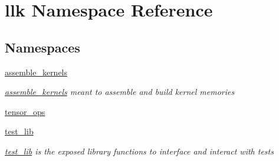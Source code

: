 \hypertarget{namespacellk}{}\section{llk Namespace Reference}
\label{namespacellk}
\subsection*{Namespaces}
\begin{DoxyCompactItemize}
\item 
 \hyperlink{namespacellk_1_1assemble__kernels}{assemble\+\_\+kernels}
\begin{DoxyCompactList}\small\item\em \hyperlink{namespacellk_1_1assemble__kernels}{assemble\+\_\+kernels} meant to assemble and build kernel memories \end{DoxyCompactList}\item 
 \hyperlink{namespacellk_1_1tensor__ops}{tensor\+\_\+ops}
\item 
 \hyperlink{namespacellk_1_1test__lib}{test\+\_\+lib}
\begin{DoxyCompactList}\small\item\em \hyperlink{namespacellk_1_1test__lib}{test\+\_\+lib} is the exposed library functions to interface and interact with tests \end{DoxyCompactList}\end{DoxyCompactItemize}
